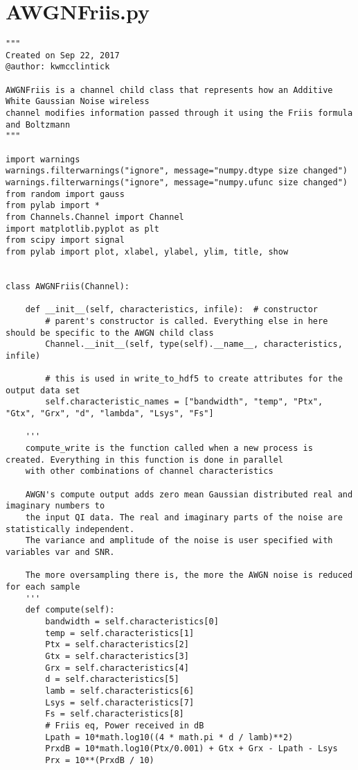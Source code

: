 \section{AWGNFriis.py}
\begin{lstlisting}[breaklines]
"""
Created on Sep 22, 2017
@author: kwmcclintick

AWGNFriis is a channel child class that represents how an Additive White Gaussian Noise wireless
channel modifies information passed through it using the Friis formula and Boltzmann
"""

import warnings
warnings.filterwarnings("ignore", message="numpy.dtype size changed")
warnings.filterwarnings("ignore", message="numpy.ufunc size changed")
from random import gauss
from pylab import *
from Channels.Channel import Channel
import matplotlib.pyplot as plt
from scipy import signal
from pylab import plot, xlabel, ylabel, ylim, title, show


class AWGNFriis(Channel):
    
    def __init__(self, characteristics, infile):  # constructor
        # parent's constructor is called. Everything else in here should be specific to the AWGN child class
        Channel.__init__(self, type(self).__name__, characteristics, infile)

        # this is used in write_to_hdf5 to create attributes for the output data set
        self.characteristic_names = ["bandwidth", "temp", "Ptx", "Gtx", "Grx", "d", "lambda", "Lsys", "Fs"]

    '''
    compute_write is the function called when a new process is created. Everything in this function is done in parallel
    with other combinations of channel characteristics

    AWGN's compute output adds zero mean Gaussian distributed real and imaginary numbers to
    the input QI data. The real and imaginary parts of the noise are statistically independent.
    The variance and amplitude of the noise is user specified with variables var and SNR.

    The more oversampling there is, the more the AWGN noise is reduced for each sample
    '''
    def compute(self):
        bandwidth = self.characteristics[0]
        temp = self.characteristics[1]
        Ptx = self.characteristics[2]
        Gtx = self.characteristics[3]
        Grx = self.characteristics[4]
        d = self.characteristics[5]
        lamb = self.characteristics[6]
        Lsys = self.characteristics[7]
        Fs = self.characteristics[8]
        # Friis eq, Power received in dB
        Lpath = 10*math.log10((4 * math.pi * d / lamb)**2)
        PrxdB = 10*math.log10(Ptx/0.001) + Gtx + Grx - Lpath - Lsys
        Prx = 10**(PrxdB / 10)


\end{lstlisting}
